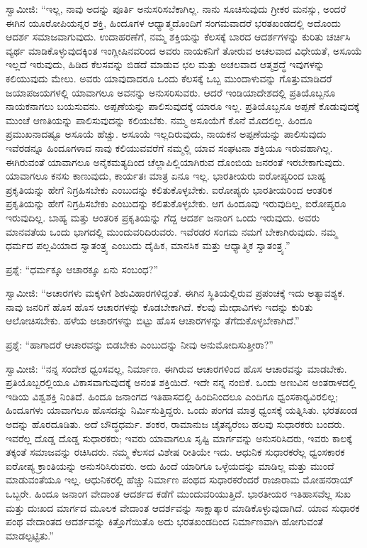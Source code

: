  ಸ್ವಾಮೀಜಿ: “ಇಲ್ಲ, ನಾವು ಅದನ್ನು ಪೂರ್ತಿ ಅನುಸರಿಸಬೆಕಾಗಿಲ್ಲ. ನಾನು ಸೂಚಿಸುವುದು ಗ್ರೀಕರ ಮನಸ್ಸು, ಅಂದರೆ ಈಗಿನ ಯೂರೋಪಿಯನ್ನರ ಶಕ್ತಿ, ಹಿಂದೂಗಳ ಆಧ್ಯಾತ್ಮದೊಂದಿಗೆ ಸಂಗಮವಾದರೆ ಭರತಖಂಡದಲ್ಲಿ ಅದೊಂದು ಆದರ್ಶ ಸಮಾಜವಾಗುವುದು. ಉದಾಹರಣೆಗೆ, ನಮ್ಮ ಶಕ್ತಿಯನ್ನು ಕೆಲಸಕ್ಕೆ ಬಾರದ ಆದರ್ಶಗಳನ್ನು ಕುರಿತು ಚರ್ಚಿಸಿ ವ್ಯರ್ಥ ಮಾಡಿಕೊಳ್ಳುವುದಕ್ಕಿಂತ ಇಂಗ್ಲೀಷಿನವರಿಂದ ಅವರು ನಾಯಕನಿಗೆ ತೋರುವ ಅಚಲವಾದ ವಿಧೇಯತೆ, ಅಸೂಯೆ ಇಲ್ಲದೆ ಇರುವುದು, ಹಿಡಿದ ಕೆಲಸವನ್ನು ಬಿಡದೆ ಮಾಡುವ ಛಲ ಮತ್ತು ಅಚಲವಾದ ಆತ್ಮಶ್ರದ್ಧೆ ಇವುಗಳನ್ನು ಕಲಿಯುವುದು ಮೇಲು. ಅವರು ಯಾವುದಾದರೂ ಒಂದು ಕೆಲಸಕ್ಕೆ ಒಬ್ಬ ಮುಂದಾಳುವನ್ನು ಗೊತ್ತುಮಾಡಿದರೆ ಜಯಾಪಜಯಗಳಲ್ಲಿ ಯಾವಾಗಲೂ ಅವನನ್ನು ಅನುಸರಿಸುವರು. ಆದರೆ ಇಂಡಿಯಾದೇಶದಲ್ಲಿ ಪ್ರತಿಯೊಬ್ಬನೂ ನಾಯಕನಾಗಲು ಬಯಸುವನು. ಅಪ್ಪಣೆಯನ್ನು ಪಾಲಿಸುವುದಕ್ಕೆ ಯಾರೂ ಇಲ್ಲ. ಪ್ರತಿಯೊಬ್ಬನೂ ಅಪ್ಪಣೆ ಕೊಡುವುದಕ್ಕೆ ಮುಂಚೆ ಆಣತಿಯನ್ನು ಪಾಲಿಸುವುದನ್ನು ಕಲಿಯಬೆಕು. ನಮ್ಮ ಅಸೂಯೆಗೆ ಕೊನೆ ಮೊದಲಿಲ್ಲ. ಹಿಂದೂ ಪ್ರಮುಖನಾದಷ್ಟೂ ಅಸೂಯೆ ಹೆಚ್ಚು. ಅಸೂಯೆ ಇಲ್ಲದಿರುವುದು, ನಾಯಕನ ಅಪ್ಪಣೆಯನ್ನು ಪಾಲಿಸುವುದು ಇವೆರಡನ್ನೂ ಹಿಂದೂಗಳಾದ ನಾವು ಕಲಿಯುವವರೆಗೆ ನಮ್ಮಲ್ಲಿ ಯಾವ ಸಂಘಟನಾ ಶಕ್ತಿಯೂ ಇರುವಹಾಗಿಲ್ಲ. ಈಗಿರುವಂತೆ ಯಾವಾಗಲೂ ಅನೈಕಮತ್ಯದಿಂದ ಚೆಲ್ಲಾಪಿಲ್ಲಿಯಾಗಿರುವ ದೊಂಬಿಯ ಜನರಂತೆ ಇರಬೇಕಾಗುವುದು. ಯಾವಾಗಲೂ ಕನಸು ಕಾಣುವುದು, ಕಾರ್ಯತಃ ಮಾತ್ರ ಏನೂ ಇಲ್ಲ. ಭಾರತೀಯರು ಐರೋಪ್ಯರಿಂದ ಬಾಹ್ಯ ಪ್ರಕೃತಿಯನ್ನು ಹೇಗೆ ನಿಗ್ರಹಿಸಬೇಕು ಎಂಬುದನ್ನು ಕಲಿತುಕೊಳ್ಳಬೇಕು. ಐರೋಪ್ಯರು ಭಾರತೀಯರಿಂದ ಆಂತರಿಕ ಪ್ರಕೃತಿಯನ್ನು ಹೇಗೆ ನಿಗ್ರಹಿಸಬೇಕು ಎಂಬುದನ್ನು ಕಲಿತುಕೊಳ್ಳಬೇಕು. ಆಗ ಹಿಂದೂವು ಇರುವುದಿಲ್ಲ, ಐರೋಪ್ಯರೂ ಇರುವುದಿಲ್ಲ. ಬಾಹ್ಯ ಮತ್ತು ಆಂತರಿಕ ಪ್ರಕೃತಿಯನ್ನು ಗೆದ್ದ ಆದರ್ಶ ಜನಾಂಗ ಒಂದು ಇರುವುದು. ಅವರು ಮಾನವತೆಯ ಒಂದು ಭಾಗದಲ್ಲಿ ಮುಂದುವರಿದಿರುವರು. ಇವೆರಡರ ಸಂಗಮ ನಮಗೆ ಬೇಕಾಗಿರುವುದು. ನಮ್ಮ ಧರ್ಮದ ಪಲ್ಲವಿಯಾದ ಸ್ವಾತಂತ್ರ್ಯ ಎಂಬುದು ದೈಹಿಕ, ಮಾನಸಿಕ ಮತ್ತು ಆಧ್ಯಾತ್ಮಿಕ ಸ್ವಾತಂತ್ರ್ಯ.” 

 ಪ್ರಶ್ನೆ: “ಧರ್ಮಕ್ಕೂ ಆಚಾರಕ್ಕೂ ಏನು ಸಂಬಂಧ?” 

 ಸ್ವಾಮೀಜಿ: “ಅಚಾರಗಳು ಮಕ್ಕಳಿಗೆ ಶಿಶುವಿಹಾರಗಳಿದ್ದಂತೆ. ಈಗಿನ ಸ್ಥಿತಿಯಲ್ಲಿರುವ ಪ್ರಪಂಚಕ್ಕೆ ಇದು ಅತ್ಯಾವಶ್ಯಕ. ನಾವು ಜನರಿಗೆ ಹೊಸ ಹೊಸ ಆಚಾರಗಳನ್ನು ಕೊಡಬೇಕಾಗಿದೆ. ಕೆಲವು ಮೇಧಾವಿಗಳು ಇದನ್ನು ಕುರಿತು ಆಲೋಚಿಸಬೇಕು. ಹಳೆಯ ಆಚಾರಗಳನ್ನು ಬಿಟ್ಟು ಹೊಸ ಆಚಾರಗಳನ್ನು ತೆಗೆದುಕೊಳ್ಳಬೇಕಾಗಿದೆ.” 

 ಪ್ರಶ್ನೆ: “ಹಾಗಾದರೆ ಆಚಾರವನ್ನು ಬಿಡಬೇಕು ಎಂಬುದನ್ನು ನೀವು ಅನುಮೋದಿಸುತ್ತೀರಾ?” 

 ಸ್ವಾಮೀಜಿ: “ನನ್ನ ಸಂದೇಶ ಧ್ವಂಸವಲ್ಲ, ನಿರ್ಮಾಣ. ಈಗಿರುವ ಆಚಾರಗಳಿಂದ ಹೊಸ ಆಚಾರವನ್ನು ಮಾಡಬೇಕು. ಪ್ರತಿಯೊಬ್ಬರಲ್ಲಿಯೂ ವಿಕಾಸವಾಗುವುದಕ್ಕೆ ಅನಂತ ಶಕ್ತಿಯಿದೆ. ಇದೇ ನನ್ನ ನಂಬಿಕೆ. ಒಂದು ಅಣುವಿನ ಅಂತರಾಳದಲ್ಲಿ ಇಡಿಯ ವಿಶ್ವಶಕ್ತಿ ನಿಂತಿದೆ. ಹಿಂದೂ ಜನಾಂಗದ ಇತಿಹಾಸದಲ್ಲಿ ಹಿಂದಿನಿಂದಲೂ ಎಂದಿಗೂ ಧ್ವಂಸಕಾರ‍್ಯವಿರಲಿಲ್ಲ; ಹಿಂದೂಗಳು ಯಾವಾಗಲೂ ಹೊಸದನ್ನು ನಿರ್ಮಿಸುತ್ತಿದ್ದರು. ಒಂದು ಪಂಗಡ ಮಾತ್ರ ಧ್ವಂಸಕ್ಕೆ ಯತ್ನಿಸಿತು. ಭರತಖಂಡ ಅದನ್ನು ಹೊರದೂಡಿತು. ಅದೆ ಬೌದ್ಧಧರ್ಮ. ಶಂಕರ, ರಾಮಾನುಜ ಚೈತನ್ಯರೆಂಬ ಹಲವು ಸುಧಾರಕರು ಬಂದರು. ಇವರೆಲ್ಲ ದೊಡ್ಡ ದೊಡ್ಡ ಸುಧಾರಕರು; ಇವರು ಯಾವಾಗಲೂ ಸೃಷ್ಟಿ ಮಾರ್ಗವನ್ನು ಅನುಸರಿಸಿದರು, ಇವರು ಕಾಲಕ್ಕೆ ತಕ್ಕಂತೆ ಸಮಾಜವನ್ನು ರಚಿಸಿದರು. ನಮ್ಮ ಕೆಲಸದ ವಿಶೇಷ ರೀತಿಯೇ ಇದು. ಆಧುನಿಕ ಸುಧಾರಕರೆಲ್ಲ ಧ್ವಂಸಕಾರಕ ಐರೋಪ್ಯ ಕ್ರಾಂತಿಯನ್ನು ಅನುಸರಿಸಿರುವರು. ಅದು ಹಿಂದೆ ಯಾರಿಗೂ ಒಳ್ಳೆಯದನ್ನು ಮಾಡಿಲ್ಲ ಮತ್ತು ಮುಂದೆ ಮಾಡುವಂತೆಯೂ ಇಲ್ಲ. ಆಧುನಿಕರಲ್ಲಿ ಹೆಚ್ಚು ನಿರ್ಮಾಣ ಪಂಥದ ಸುಧಾರಕರೆಂದರೆ ರಾಜಾರಾಮ ಮೋಹನರಾಯ್ ಒಬ್ಬರೇ. ಹಿಂದೂ ಜನಾಂಗ ವೇದಾಂತ ಆದರ್ಶದ ಕಡೆಗೆ ಮುಂದುವರಿಯುತ್ತಿದೆ. ಭಾರತೀಯರ ಇತಿಹಾಸವೆಲ್ಲ ಸುಖ ಮತ್ತು ದುಃಖದ ಮಾರ್ಗದ ಮೂಲಕ ವೇದಾಂತ ಆದರ್ಶವನ್ನು ಸಾಕ್ಷಾತ್ಕಾರ ಮಾಡಿಕೊಳ್ಳುವುದಾಗಿದೆ. ಯಾವ ಸುಧಾರಕ ಪಂಥ ವೇದಾಂತದ ಆದರ್ಶವನ್ನು ಕಿತ್ತೊಗೆಯಿತೊ ಅದು ಭರತಖಂಡದಿಂದ ನಿರ್ಮಾಣವಾಗಿ ಹೋಗುವಂತೆ ಮಾಡಲ್ಪಟ್ಟಿತು.” 

